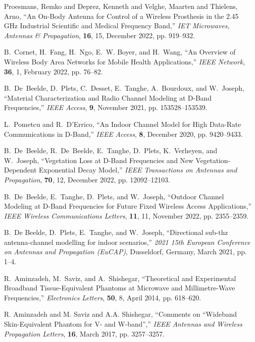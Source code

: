 \documentclass[preprint]{rsl}
\begin{document}
\begin{thebibliography}{9}
Proesmans, Remko and Deprez, Kenneth and Velghe, Maarten and Thielens, Arno,
``An On-Body Antenna for Control of a Wireless Prosthesis in the 2.45 GHz Industrial Scientific and Medical Frequency Band,'' \emph{IET Microwaves, Antennas \& Propagation}, \textbf{16}, {15}, December 2022, pp. {919--932}.

B.~Cornet, H.~Fang, H.~Ngo, E.~W. Boyer, and H.~Wang, 
``An Overview of Wireless Body Area Networks for Mobile Health Applications,'' 
\emph{IEEE Network}, \textbf{36}, 1, February 2022, pp. 76--82.

B.~De~Beelde, D.~Plets, C.~Desset, E.~Tanghe, A.~Bourdoux, and W.~Joseph,
``Material Characterization and Radio Channel Modeling at D-Band Frequencies,'' 
\emph{IEEE Access}, \textbf{9}, November 2021, pp. 153528--153539.

L.~Pometcu and R.~D’Errico, 
``An Indoor Channel Model for High Data-Rate Communications in D-Band,'' 
\emph{IEEE Access}, \textbf{8}, December 2020, pp. 9420--9433.

B.~De~Beelde, R.~De~Beelde, E.~Tanghe, D.~Plets, K.~Verheyen, and W.~Joseph,
``Vegetation Loss at D-Band Frequencies and New Vegetation-Dependent Exponential Decay Model,'' 
\emph{IEEE Transactions on Antennas and Propagation}, \textbf{70}, 12, December 2022, pp. 12092--12103.

B.~De~Beelde, E.~Tanghe, D.~Plets, and W.~Joseph, 
``Outdoor Channel Modeling at D-Band Frequencies for Future Fixed Wireless Access Applications,''
\emph{IEEE Wireless Communications Letters}, \textbf{11}, 11, November 2022, pp. 2355--2359.

B.~{De Beelde}, D.~{Plets}, E.~{Tanghe}, and W.~{Joseph}, 
``Directional sub-thz antenna-channel modelling for indoor scenarios,'' 
\emph{2021 15th European Conference on Antennas and Propagation (EuCAP)}, Dusseldorf, Germany, March 2021, pp. 1--4.

R.~{Aminzadeh}, M.~{Saviz}, and A.~{Shishegar}, ``Theoretical and Experimental Broadband Tissue-Equivalent Phantoms at Microwave and Millimetre-Wave Frequencies,'' \emph{Electronics Letters}, \textbf{50}, 8, April 2014, pp. 618--620.

R. {Aminzadeh} and M. {Saviz} and A.A. {Shishegar}, 
``Comments on “Wideband Skin-Equivalent Phantom for V- and W-band”,'' 
\emph{IEEE Antennas and Wireless Propagation Letters}, \textbf{16}, March 2017, pp. 3257--3257.


\end{thebibliography}
\end{document}
